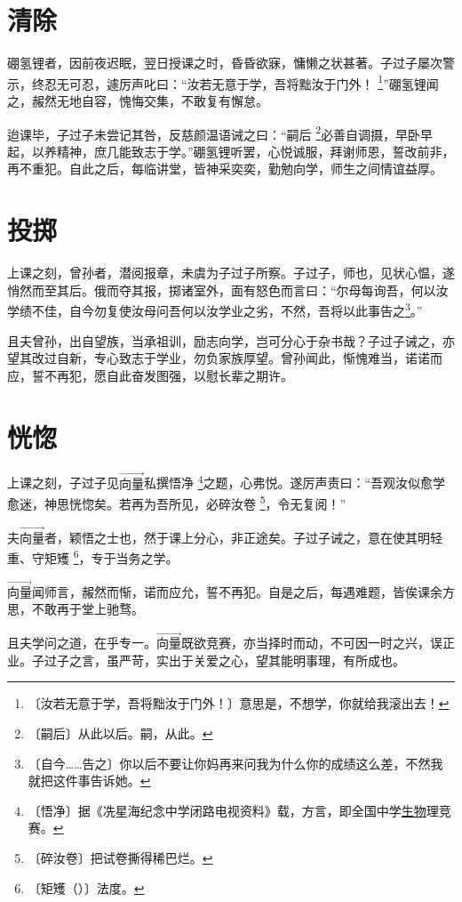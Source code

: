 \documentclass[b5paper,zihao=-4]{ctexbook}
\newcommand{\zhushi}[2]{#1 \footnote{〔#1〕#2}}
\newcommand{\zhushipy}[3]{#1 \footnote{〔#2〕#3}}
\newcommand{\xiangliang}{\overrightarrow{\text{向量}}}
\begin{document}
\chapter{清除}

硼氢锂者，因前夜迟眠，翌日授课之时，昏昏欲寐，慵懒之状甚著。子过子屡次警示，终忍无可忍，遽厉声叱曰：“\zhushi{汝若无意于学，吾将黜汝于门外！}{意思是，不想学，你就给我滚出去！}”硼氢锂闻之，赧然无地自容，愧悔交集，不敢复有懈怠。

迨课毕，子过子未尝记其咎，反慈颜温语诫之曰：“\zhushi{嗣后}{从此以后。嗣，从此。}必善自调摄，早卧早起，以养精神，庶几能致志于学。”硼氢锂听罢，心悦诚服，拜谢师恩，誓改前非，再不重犯。自此之后，每临讲堂，皆神采奕奕，勤勉向学，师生之间情谊益厚。

\chapter{投掷}

上课之刻，曾孙者，潜阅报章，未虞为子过子所察。子过子，师也，见状心愠，遂悄然而至其后。俄而夺其报，掷诸室外，面有怒色而言曰：“尔母每询吾，何以汝学绩不佳，自今勿复使汝母问吾何以汝学业之劣，不然，吾将以此事告之\footnote{〔自今……告之〕你以后不要让你妈再来问我为什么你的成绩这么差，不然我就把这件事告诉她。}。”

且夫曾孙，出自望族，当承祖训，励志向学，岂可分心于杂书哉？子过子诫之，亦望其改过自新，专心致志于学业，勿负家族厚望。曾孙闻此，惭愧难当，诺诺而应，誓不再犯，愿自此奋发图强，以慰长辈之期许。

\chapter{恍惚}

上课之刻，子过子见$\xiangliang$私撰\zhushi{悟净}{据《冼星海纪念中学闭路电视资料》载，方言，即全国中学\underline{生物}\hspace{-0.05em}理竞赛。}之题，心弗悦。遂厉声责曰：“吾观汝似愈学愈迷，神思恍惚矣。若再为吾所见，必\zhushi{碎汝卷}{把试卷撕得稀巴烂。}，令无复阅！”

夫$\xiangliang$者，颖悟之士也，然于课上分心，非正途矣。子过子诫之，意在使其明轻重、守\zhushipy{矩矱}{矩矱（）}{法度。}，专于当务之学。

$\xiangliang$闻师言，赧然而惭，诺而应允，誓不再犯。自是之后，每遇难题，皆俟课余方思，不敢再于堂上驰骛。

且夫学问之道，在乎专一。$\xiangliang$既欲竞赛，亦当择时而动，不可因一时之兴，误正业。子过子之言，虽严苛，实出于关爱之心，望其能明事理，有所成也。
\end{document}
